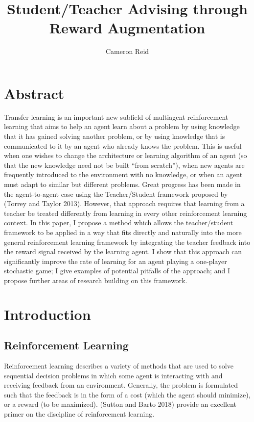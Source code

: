 \documentclass[twocolumn]{article}
\title{Student/Teacher Advising through Reward Augmentation}
\author{Cameron Reid}
\date{}
\begin{document}
\maketitle

\hypertarget{abstract}{\section{Abstract}\label{abstract}}

Transfer learning is an important new subfield of multiagent
reinforcement learning that aims to help an agent learn about a problem
by using knowledge that it has gained solving another problem, or by
using knowledge that is communicated to it by an agent who already knows
the problem. This is useful when one wishes to change the architecture
or learning algorithm of an agent (so that the new knowledge need not be
built ``from scratch''), when new agents are frequently introduced to
the environment with no knowledge, or when an agent must adapt to
similar but different problems. Great progress has been made in the
agent-to-agent case using the Teacher/Student framework proposed by
(Torrey and Taylor 2013). However, that approach requires that learning
from a teacher be treated differently from learning in every other
reinforcement learning context. In this paper, I propose a method which
allows the teacher/student framework to be applied in a way that fits
directly and naturally into the more general reinforcement learning
framework by integrating the teacher feedback into the reward signal
received by the learning agent. I show that this approach can
significantly improve the rate of learning for an agent playing a
one-player stochastic game; I give examples of potential pitfalls of the
approach; and I propose further areas of research building on this
framework.

\hypertarget{introduction}{\section{Introduction}\label{introduction}}

\hypertarget{reinforcement-learning}{\subsection{Reinforcement Learning}\label{reinforcement-learning}}

Reinforcement learning describes a variety of methods that are used to
solve sequential decision problems in which some agent is interacting
with and receiving feedback from an environment. Generally, the problem
is formulated such that the feedback is in the form of a cost (which the
agent should minimize), or a reward (to be maximized). (Sutton and Barto
2018) provide an excellent primer on the discipline of reinforcement
learning.
\end{document}
